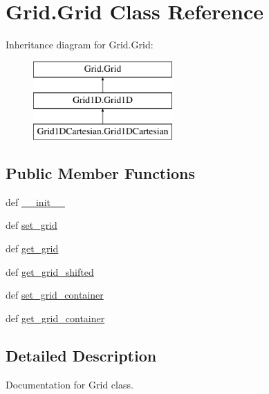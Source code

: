 \hypertarget{classGrid_1_1Grid}{\section{Grid.\-Grid Class Reference}
\label{classGrid_1_1Grid}
}
Inheritance diagram for Grid.\-Grid\-:\begin{figure}[H]
\begin{center}
\leavevmode
\includegraphics[height=3.000000cm]{classGrid_1_1Grid}
\end{center}
\end{figure}
\subsection*{Public Member Functions}
\begin{DoxyCompactItemize}
\item 
def \hyperlink{classGrid_1_1Grid_acbb39beb7e85435989317b14ac7000a6}{\-\_\-\-\_\-init\-\_\-\-\_\-}
\item 
def \hyperlink{classGrid_1_1Grid_a13472fee60bf774164952c7536fcbf78}{set\-\_\-grid}
\item 
def \hyperlink{classGrid_1_1Grid_a36d045afd1df02a5042c3067b200e11a}{get\-\_\-grid}
\item 
def \hyperlink{classGrid_1_1Grid_ae91a6887196a4c294aec24ee5a459ad4}{get\-\_\-grid\-\_\-shifted}
\item 
def \hyperlink{classGrid_1_1Grid_aede8950228046ba7d946279b5dcb62d6}{set\-\_\-grid\-\_\-container}
\item 
def \hyperlink{classGrid_1_1Grid_afbc0b152099899bf629021c9a01e5d16}{get\-\_\-grid\-\_\-container}
\end{DoxyCompactItemize}


\subsection{Detailed Description}
\begin{DoxyVerb}Documentation for Grid class.
\end{DoxyVerb}
 

